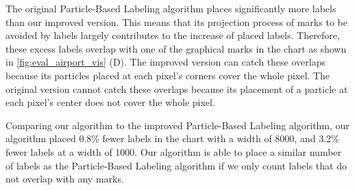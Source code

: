 The original Particle-Based Labeling algorithm places significantly more labels than our improved version.
This means that its projection process of marks to be avoided by labels largely contributes to the increase of placed labels.
Therefore, these excess labels overlap with one of the graphical marks in the chart as shown in \autoref{fig:eval_airport_vis} (D).
The improved version can catch these overlaps because its particles placed at each pixel's corners cover the whole pixel.
The original version cannot catch these overlaps because its placement of a particle at each pixel's center does not cover the whole pixel.

Comparing our algorithm to the improved Particle-Based Labeling algorithm, our algorithm placed 0.8\% fewer labels in the chart with a width of 8000, and 3.2\% fewer labels at a width of 1000.
Our algorithm is able to place a similar number of labels as the Particle-Based Labeling algorithm if we only count labels that do not overlap with any marks.
